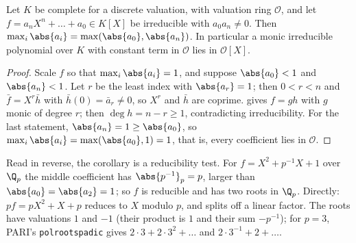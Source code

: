 \begin{corollary}\label{cor:local:irreducible}
Let $K$ be complete for a discrete valuation, with valuation ring $\mathcal O$, and let $f=a_nX^n+\dots+a_0\in K[X]$ be irreducible with $a_0a_n\ne0$.
Then $\max_i\abs{a_i}=\max(\abs{a_0},\abs{a_n})$. In particular a monic irreducible polynomial over $K$ with constant term in $\mathcal O$ lies in
$\mathcal O[X]$.
\end{corollary}

\begin{proof}
Scale $f$ so that $\max_i\abs{a_i}=1$, and suppose $\abs{a_0}<1$ and $\abs{a_n}<1$. Let $r$ be the least index with $\abs{a_r}=1$; then $0<r<n$ and
$\bar f=X^r\bar h$ with $\bar h(0)=\bar a_r\ne0$, so $X^r$ and $\bar h$ are coprime.  gives $f=gh$ with $g$ monic of
degree $r$; then $\deg h=n-r\ge1$, contradicting irreducibility. For the last statement, $\abs{a_n}=1\ge\abs{a_0}$, so
$\max_i\abs{a_i}=\max(\abs{a_0},1)=1$, that is, every coefficient lies in $\mathcal O$.
\end{proof}

Read in reverse, the corollary is a reducibility test. For $f=X^2+p^{-1}X+1$ over $\Q_p$ the middle coefficient has $\abs{p^{-1}}_p=p$, larger
than $\abs{a_0}=\abs{a_2}=1$; so $f$ is reducible and has two roots in $\Q_p$. Directly: $pf=pX^2+X+p$ reduces to $X$ modulo $p$, and
 splits off a linear factor. The roots have valuations $1$ and $-1$ (their product is $1$ and their sum $-p^{-1}$);
for $p=3$, PARI's \texttt{polrootspadic} gives $2\cdot3+2\cdot3^2+\dots$ and $2\cdot3^{-1}+2+\dots$.

